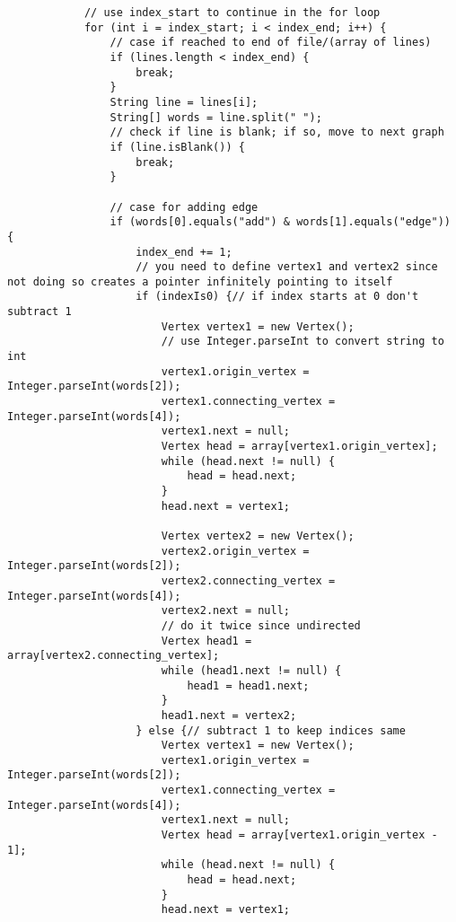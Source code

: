 \documentclass{article}
\begin{document}
\begin{lstlisting}
            // use index_start to continue in the for loop
            for (int i = index_start; i < index_end; i++) {
                // case if reached to end of file/(array of lines)
                if (lines.length < index_end) {
                    break;
                }
                String line = lines[i];
                String[] words = line.split(" ");
                // check if line is blank; if so, move to next graph
                if (line.isBlank()) {
                    break;
                }

                // case for adding edge
                if (words[0].equals("add") & words[1].equals("edge")) {
                    index_end += 1;
                    // you need to define vertex1 and vertex2 since not doing so creates a pointer infinitely pointing to itself
                    if (indexIs0) {// if index starts at 0 don't subtract 1
                        Vertex vertex1 = new Vertex();
                        // use Integer.parseInt to convert string to int
                        vertex1.origin_vertex = Integer.parseInt(words[2]);
                        vertex1.connecting_vertex = Integer.parseInt(words[4]);
                        vertex1.next = null;
                        Vertex head = array[vertex1.origin_vertex];
                        while (head.next != null) {
                            head = head.next;
                        }
                        head.next = vertex1;

                        Vertex vertex2 = new Vertex();
                        vertex2.origin_vertex = Integer.parseInt(words[2]);
                        vertex2.connecting_vertex = Integer.parseInt(words[4]);
                        vertex2.next = null;
                        // do it twice since undirected
                        Vertex head1 = array[vertex2.connecting_vertex];
                        while (head1.next != null) {
                            head1 = head1.next;
                        }
                        head1.next = vertex2;
                    } else {// subtract 1 to keep indices same
                        Vertex vertex1 = new Vertex();
                        vertex1.origin_vertex = Integer.parseInt(words[2]);
                        vertex1.connecting_vertex = Integer.parseInt(words[4]);
                        vertex1.next = null;
                        Vertex head = array[vertex1.origin_vertex - 1];
                        while (head.next != null) {
                            head = head.next;
                        }
                        head.next = vertex1;


\end{lstlisting}
\end{document}
